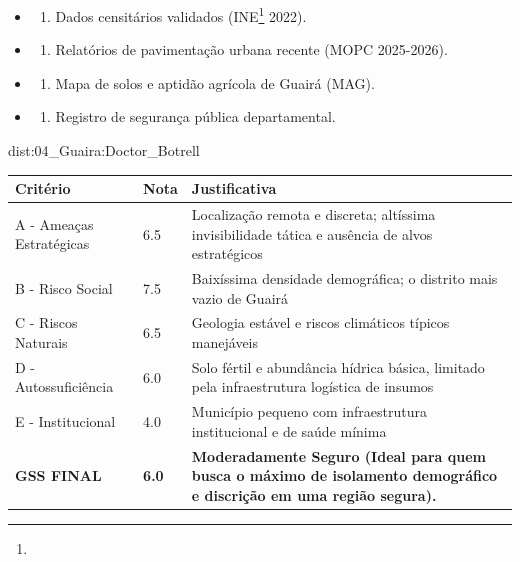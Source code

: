 {\begin{itemize}
\tightlist
\item
  \begin{enumerate}
  \def\labelenumi{\arabic{enumi})}
  \tightlist
  \item
    Dados censitários validados (INE\footnote{\fineINE} 2022).
  \end{enumerate}
\item
  \begin{enumerate}
  \def\labelenumi{\arabic{enumi})}
  \setcounter{enumi}{1}
  \tightlist
  \item
    Relatórios de pavimentação urbana recente (MOPC 2025-2026).
  \end{enumerate}
\item
  \begin{enumerate}
  \def\labelenumi{\arabic{enumi})}
  \setcounter{enumi}{2}
  \tightlist
  \item
    Mapa de solos e aptidão agrícola de Guairá (MAG).
  \end{enumerate}
\item
  \begin{enumerate}
  \def\labelenumi{\arabic{enumi})}
  \setcounter{enumi}{3}
  \tightlist
  \item
    Registro de segurança pública departamental.
  \end{enumerate}
\end{itemize}}{dist:04_Guaira:Doctor_Botrell}
\begin{table}[ht!]
\small \begin{tabular}{p{3.0cm}p{0.8cm}p{6.0cm}} \toprule
\textbf{Critério} & \textbf{Nota} & \textbf{Justificativa} \\ \midrule
A - Ameaças Estratégicas & 6.5 & Localização remota e discreta; altíssima invisibilidade tática e ausência de alvos estratégicos \\
B - Risco Social & 7.5 & Baixíssima densidade demográfica; o distrito mais vazio de Guairá \\
C - Riscos Naturais & 6.5 & Geologia estável e riscos climáticos típicos manejáveis \\
D - Autossuficiência & 6.0 & Solo fértil e abundância hídrica básica, limitado pela infraestrutura logística de insumos \\
E - Institucional & 4.0 & Município pequeno com infraestrutura institucional e de saúde mínima \\
\midrule \textbf{GSS FINAL} & \textbf{6.0} & \textbf{Moderadamente Seguro (Ideal para quem busca o máximo de isolamento demográfico e discrição em uma região segura).} \\ \bottomrule \end{tabular}
\end{table}
